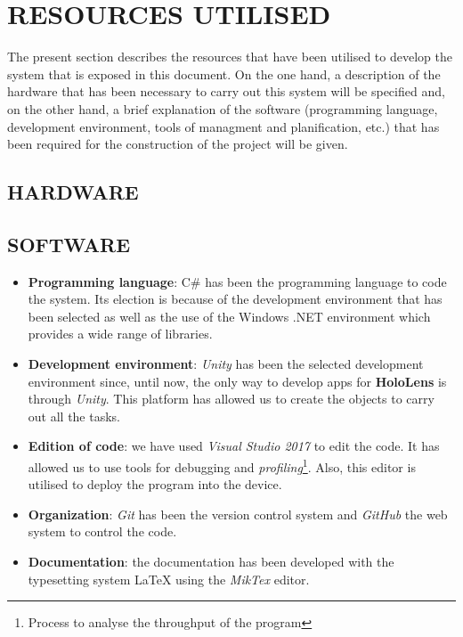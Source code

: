 \documentclass{pre-tfg}
\begin{document}
\section{RESOURCES UTILISED}
The present section describes the resources that have been utilised to develop the system that is exposed in this document. On
the one hand, a description of the hardware that has been necessary to carry out this system will be specified and, on the other hand,
a brief explanation of the software (programming language, development environment, tools of managment and planification, etc.)
that has been required for the construction of the project will be given.

\subsection{HARDWARE}

\subsection{SOFTWARE}
\begin{itemize}
\item \textbf{Programming language}: C\# has been the programming language to code the system. Its election is because of the
development environment that has been selected as well as the use of the Windows .NET environment 
which provides a wide range of libraries.
\item \textbf{Development environment}: \textit{Unity} has been the selected development environment since, until now,
the only way to develop apps for \textbf{HoloLens} is through \textit{Unity}. This platform has allowed us to create the objects to 
carry out all the tasks.
\item \textbf{Edition of code}: we have used \textit{Visual Studio 2017} to edit the code. It has allowed us to use tools for
debugging and \textit{profiling}\footnote{Process to analyse the throughput of the program}. Also, this editor is utilised to deploy
the program into the device.
\item \textbf{Organization}: \textit{Git} has been the version control system and \textit{GitHub} the web system to control the code.
\item \textbf{Documentation}: the documentation has been developed with the typesetting system \LaTeX \hspace{0.5mm} using the
\textit{MikTex} editor.
\end{itemize}
\end{document}
